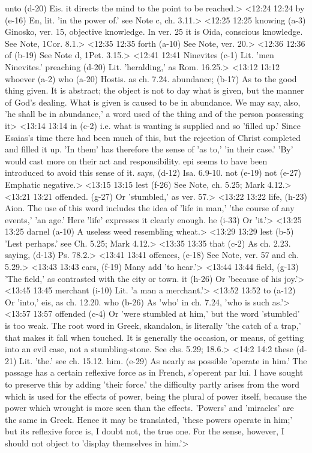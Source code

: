   unto (d-20)  Eis. it directs the mind to the point to be reached.>
<12:24 12:24  by (e-16)  En, lit. 'in the power of.' see Note c, ch. 3.11.>
<12:25 12:25  knowing (a-3)  Ginosko, ver. 15, objective knowledge. In ver. 25 it is  Oida, conscious knowledge. See Note, 1Cor. 8.1.>
<12:35 12:35  forth (a-10)  See Note, ver. 20.>
<12:36 12:36  of (b-19)  See Note d, 1Pet. 3.15.>
<12:41 12:41  Ninevites (c-1)  Lit. 'men Ninevites.'
  preaching (d-20)  Lit. 'heralding,' as Rom. 16.25.>
<13:12 13:12  whoever (a-2)  who (a-20)  Hostis. as ch. 7.24.
  abundance; (b-17)  As to the good thing given. It is abstract; the object is not  to day what is given, but the manner of God's dealing. What  is given is caused to be in abundance. We may say, also, 'he  shall be in abundance,' a word used of the thing and of the  person possessing it>
<13:14 13:14  in (c-2)  i.e. what is wanting is supplied and so 'filled up.' Since  Esaias's time there had been much of this, but the rejection of  Christ completed and filled it up. 'In them' has therefore the  sense of 'as to,' 'in their case.' 'By' would cast more on  their act and responsibility. epi seems to have been  introduced to avoid this sense of it.
  says, (d-12)  Isa. 6.9-10.
  not (e-19)  not (e-27)
  Emphatic negative.>
<13:15 13:15  lest (f-26)  See Note, ch. 5.25; Mark 4.12.>
<13:21 13:21  offended. (g-27)  Or 'stumbled,' as ver. 57.>
<13:22 13:22  life, (h-23)  Aion. The use of this word includes the idea of 'life in  man,' 'the course of any events,' 'an age.' Here 'life'  expresses it clearly enough.
  he (i-33)  Or 'it.'>
<13:25 13:25  darnel (a-10)  A useless weed resembling wheat.>
<13:29 13:29  lest (b-5)  'Lest perhaps.' see Ch. 5.25; Mark 4.12.>
<13:35 13:35  that (c-2)  As ch. 2.23.
  saying, (d-13)  Ps. 78.2.>
<13:41 13:41  offences, (e-18)  See Note, ver. 57 and ch. 5.29.>
<13:43 13:43  ears, (f-19)  Many add 'to hear.'>
<13:44 13:44  field, (g-13)  'The field,' as contrasted with the city or town.
  it (h-26)  Or 'because of his joy.'>
<13:45 13:45  merchant (i-10)  Lit. 'a man a merchant.'>
<13:52 13:52  to (a-12)  Or 'into,' eis, as ch. 12.20.
  who (b-26)  As 'who' in ch. 7.24, 'who is such as.'>
<13:57 13:57  offended (c-4)  Or 'were stumbled at him,' but the word 'stumbled' is too  weak. The root word in Greek, skandalon, is literally 'the  catch of a trap,' that makes it fall when touched. It is  generally the occasion, or means, of getting into an evil case,  not a stumbling-stone. See chs. 5.29; 18.6.>
<14:2 14:2  these (d-21)  Lit. 'the.' see ch. 15.12.
  him. (e-29)  As nearly as possible 'operate in him.' The passage has a  certain reflexive force as in French, s'operent par lui. I  have sought to preserve this by adding 'their force.' the  difficulty partly arises from the word which is used for the  effects of power, being the plural of power itself, because the  power which wrought is more seen than the effects. 'Powers' and  'miracles' are the same in Greek. Hence it may be translated,  'these powers operate in him;' but its reflexive force is, I  doubt not, the true one. For the sense, however, I should not  object to 'display themselves in him.'>
